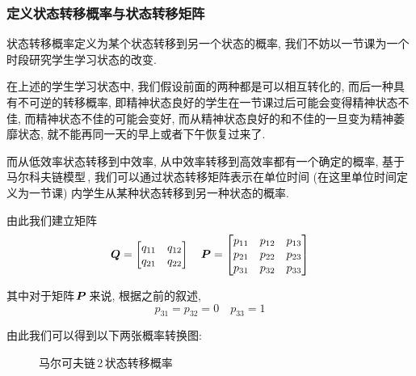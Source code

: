 \documentclass[a4paper]{article}
\renewcommand{\matrix}{\matrixsym} %
\begin{document}
  \subsubsection{定义状态转移概率与状态转移矩阵}
   状态转移概率定义为某个状态转移到另一个状态的概率, 我们不妨以一节课为一个时段研究学生学习状态的改变.\par
   在上述的学生学习状态中, 我们假设前面的两种都是可以相互转化的, 而后一种具有不可逆的转移概率, 即精神状态良好的学生在一节课过后可能会变得精神状态不佳, 而精神状态不佳的可能会变好, 而从精神状态良好的和不佳的一旦变为精神萎靡状态, 就不能再同一天的早上或者下午恢复过来了.\par
   而从低效率状态转移到中效率, 从中效率转移到高效率都有一个确定的概率, 基于马尔科夫链模型\,\cite{ISBN9787040311501-1}, 我们可以通过状态转移矩阵表示在单位时间 (在这里单位时间定义为一节课) 内学生从某种状态转移到另一种状态的概率.\par
   由此我们建立矩阵
   \begin{equation}
   \matrix{Q}=
   \begin{bmatrix}
   q_{11} & q_{12} \\
   q_{21} & q_{22}
   \end{bmatrix}\quad
   \matrix{P}=
   \begin{bmatrix}
   p_{11} & p_{12} & p_{13} \\
   p_{21} & p_{22} & p_{23} \\
   p_{31} & p_{32} & p_{33}
   \end{bmatrix}
   \end{equation}\par
   其中对于矩阵\,$\matrix{P}$\,来说, 根据之前的叙述,
   \begin{equation}
   p_{31}=p_{32}=0\quad p_{33}=1
   \end{equation}\par
   由此我们可以得到以下两张概率转换图:\par
   \begin{figure}[H]
   \centering
   \caption{马尔可夫链\,2\,状态转移概率}
   \end{figure}
\end{document}
